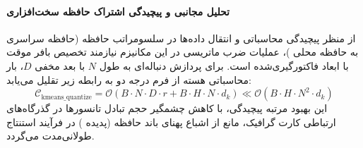 \paragraph{تحلیل مجانبی و پیچیدگی اشتراک حافظه سخت‌افزاری}
از منظر پیچیدگی محاسباتی و انتقال داده‌ها در سلسومراتب حافظه (حافظه سراسری  به حافظه محلی )، عملیات ضرب ماتریسی در این مکانیزم نیازمند تخصیص بافر موقت با ابعاد فاکتورگیری‌شده است. برای پردازش دنباله‌ای به طول $N$ با بعد مخفی $D$، بار محاسباتی هسته از فرم درجه دو به رابطه زیر تقلیل می‌یابد:
\begin{equation}
\label{eq:complexity_kmeans_quantize}
\mathcal{C}_{\text{kmeans\_quantize}} = \mathcal{O}\left( B \cdot N \cdot D \cdot r + B \cdot H \cdot N \cdot d_k \right) \ll \mathcal{O}\left( B \cdot H \cdot N^2 \cdot d_k \right)
\end{equation}
این بهبود مرتبه پیچیدگی، با کاهش چشمگیر حجم تبادل تانسورها در گذرگاه‌های ارتباطی کارت گرافیک، مانع از اشباع پهنای باند حافظه (پدیده ) در فرآیند استنتاج طولانی‌مدت می‌گردد.

